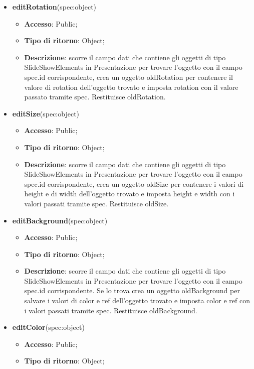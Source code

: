 {\begin{itemize}
\begin{itemize}
			\end{itemize}
			\item \textbf{editRotation}(spec:object)
			\begin{itemize}
				\item \textbf{Accesso}: Public;
				\item \textbf{Tipo di ritorno}: Object;
				\item \textbf{Descrizione}: scorre il campo dati che contiene gli oggetti di tipo SlideShowElements in Presentazione per trovare l’oggetto con il campo spec.id corrispondente, crea un oggetto oldRotation per contenere il valore di rotation dell’oggetto trovato e imposta rotation con il valore passato tramite spec. Restituisce oldRotation.
			\end{itemize}
			\item \textbf{editSize}(spec:object)
			\begin{itemize}
				\item \textbf{Accesso}: Public;
				\item \textbf{Tipo di ritorno}: Object;
				\item \textbf{Descrizione}: scorre il campo dati che contiene gli oggetti di tipo SlideShowElements in Presentazione per trovare l’oggetto con il campo spec.id corrispondente, crea un oggetto oldSize per contenere i valori di height e di width dell’oggetto trovato e imposta height e width con i valori passati tramite spec. Restituisce oldSize.
			\end{itemize}
			\item \textbf{editBackground}(spec:object)
			\begin{itemize}
				\item \textbf{Accesso}: Public;
				\item \textbf{Tipo di ritorno}: Object;
				\item \textbf{Descrizione}: scorre il campo dati che contiene gli oggetti di tipo SlideShowElements in Presentazione per trovare l’oggetto con il campo spec.id corrispondente. Se lo trova crea un oggetto oldBackground per salvare i valori di color e ref dell’oggetto trovato e imposta color e ref con i valori passati tramite spec. Restituisce oldBackground.
			\end{itemize}
			\item \textbf{editColor}(spec:object)
			\begin{itemize}
				\item \textbf{Accesso}: Public;
				\item \textbf{Tipo di ritorno}: Object;

\end{itemize}
\end{itemize}}
